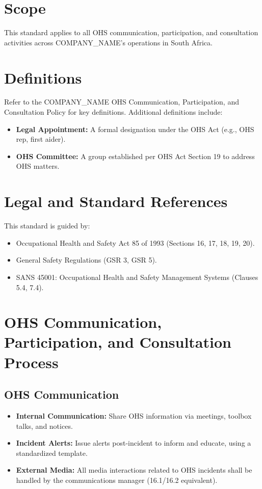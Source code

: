 \documentclass[12pt]{article}
\begin{document}
\section{Scope}
This standard applies to all OHS communication, participation, and consultation activities across {{COMPANY_NAME}}’s operations in South Africa.

\section{Definitions}
Refer to the {{COMPANY_NAME}} OHS Communication, Participation, and Consultation Policy for key definitions. Additional definitions include:
\begin{itemize}
    \item \textbf{Legal Appointment:} A formal designation under the OHS Act (e.g., OHS rep, first aider).
    \item \textbf{OHS Committee:} A group established per OHS Act Section 19 to address OHS matters.
\end{itemize}

\section{Legal and Standard References}
This standard is guided by:
\begin{itemize}
    \item Occupational Health and Safety Act 85 of 1993 (Sections 16, 17, 18, 19, 20).
    \item General Safety Regulations (GSR 3, GSR 5).
    \item SANS 45001: Occupational Health and Safety Management Systems (Clauses 5.4, 7.4).
\end{itemize}

\section{OHS Communication, Participation, and Consultation Process}

\subsection{OHS Communication}
\begin{itemize}
    \item \textbf{Internal Communication:} Share OHS information via meetings, toolbox talks, and notices.
    \item \textbf{Incident Alerts:} Issue alerts post-incident to inform and educate, using a standardized template.
    \item \textbf{External Media:} All media interactions related to OHS incidents shall be handled by the communications manager (16.1/16.2 equivalent).
\end{itemize}
\end{document}
